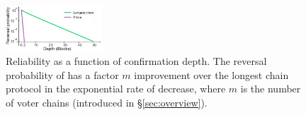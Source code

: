 


\begin{figure}
\begin{center}
\includegraphics[width=0.32\textwidth]{figures/reliability-depth.pdf}
\end{center}
\caption{\label{fig:rd} \small Reliability as a function of confirmation depth. The reversal probability of \prism has a factor $m$ improvement over the longest chain protocol in the exponential rate of decrease, where $m$ is the number of voter chains (introduced in \S\ref{sec:overview}).}
\end{figure}
